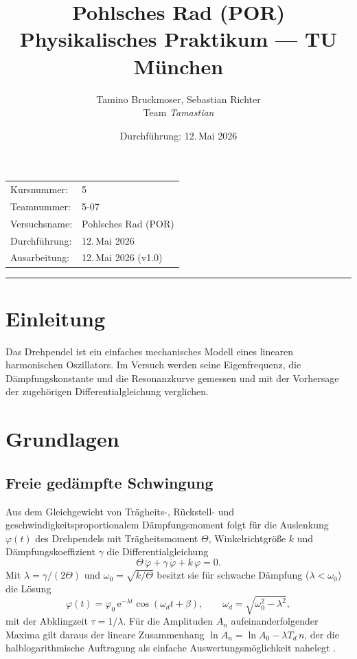 \documentclass[11pt,a4paper]{article}
\title{\vspace{-1cm}\textbf{Pohlsches Rad (POR)}\\[2pt]
\large Physikalisches Praktikum --- TU München}
\author{Tamino Bruckmoser, Sebastian Richter \\ Team \emph{Tamastian}}
\date{Durchführung: 12.\,Mai 2026}
\begin{document}
\maketitle

\noindent
\begin{tabular}{ll}
  Kursnummer:    & 5 \\
  Teamnummer:    & 5-07 \\
  Versuchsname:  & Pohlsches Rad (POR) \\
  Durchführung:  & 12.\,Mai 2026 \\
  Ausarbeitung:  & 12.\,Mai 2026 (v1.0) \\
\end{tabular}

\vspace{1ex}\hrule\vspace{0.5ex}
\tableofcontents

\section{Einleitung}
Das Drehpendel ist ein einfaches mechanisches Modell eines linearen
harmonischen Oszillators. Im Versuch werden seine Eigenfrequenz, die
Dämpfungskonstante und die Resonanzkurve gemessen und mit der
Vorhersage der zugehörigen Differentialgleichung verglichen.

\section{Grundlagen}
\subsection{Freie gedämpfte Schwingung}
Aus dem Gleichgewicht von Trägheits-, Rückstell- und
geschwindigkeitsproportionalem Dämpfungsmoment folgt für die
Auslenkung $\varphi(t)$ des Drehpendels mit Trägheitsmoment
$\Theta$, Winkelrichtgröße $k$ und Dämpfungskoeffizient $\gamma$ die
Differentialgleichung
\begin{equation}
  \Theta\,\ddot\varphi + \gamma\,\dot\varphi + k\,\varphi = 0.
  \label{eq:dgl_frei}
\end{equation}
Mit $\lambda=\gamma/(2\Theta)$ und $\omega_0=\sqrt{k/\Theta}$ besitzt
sie für schwache Dämpfung ($\lambda<\omega_0$) die Lösung
\begin{equation}
  \varphi(t) = \varphi_0\,\mathrm{e}^{-\lambda t}\cos(\omega_d t + \beta),
  \qquad \omega_d=\sqrt{\omega_0^2-\lambda^2},
  \label{eq:freie_loesung}
\end{equation}
mit der Abklingzeit $\tau=1/\lambda$. Für die Amplituden $A_n$
aufeinanderfolgender Maxima gilt daraus der lineare Zusammenhang
$\ln A_n = \ln A_0 - \lambda T_d\,n$, der die halblogarithmische
Auftragung als einfache Auswertungsmöglichkeit nahelegt
\cite{Anleitung}.
\end{document}
